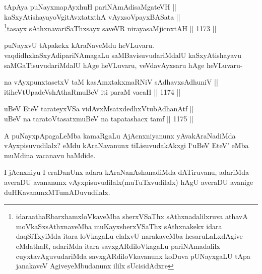 \begin{shl}
tApAya puNayxmapAyxhuH pariNAmAdisaMgateVH || \\
kaSxyAtishayayoVgitAvxtatxthA vAyxsoV\s payxBASata || \\
\footnote{idaraathaR\ndash  barxhamxloVkaveMba sherxVSaThx sAthxnadalilxruva athavA moVkaSxsAthxnaveMba muKayxsherxVSaThx sAthxnakekx idara daqSiTxyiMda itara loVkagaLu elalxvU narakaveMba hesaruLaLxdAgive eMdathaR, adariMda itara savxgARdiloVkagaLu pariNAmadalilx cuyxtavAguvudariMda savxgARdiloVkavanunx koDuva pUNayxgaLU tApa janakaveV AgiveyeMbudanunx ililx sUcisidAdxre}tasayx sAthxnavariSaThxsayx saveVR nirayasaMjicnxtAH \hfill || 1173 ||  
\end{shl}	

\begin{artha}
puNayxvU tApakekx kAraNaveMdu heVLuvaru. vaqdidhxkaSxyAdi\break pariNAmagaLu saMBavisuvudariMdalU kaSxyAtishayavu saMGaTisuvudariMdalU hAge heVLuvaru, veVdavAyxsaru hAge heVLuvaru-
\end{artha}




\begin{shl}
na vAyxpunxtasetxV taM kasAmxtakxmaRNiV sAdhavxsAdhuniV || \\
itiheVtUpadeVshAthaRmuBeV iti paraM vacaH \hfill || 1174 ||  
\end{shl}
				
\begin{shl}
uBeV EteV tarateyxVSa vidAvxMsatxdedhxVtubAdhanAtf || \\
uBeV na taratoV\s tasatxmuBeV na tapatashacx tamf \hfill || 1175 ||  
\end{shl}

\begin{artha}
A puNayxpApagaLeMba kamaRgaLu AjAcnxniyanunx yAvakAraNadiMda vAyxpisuvudilalx? eMdu 
kAraNavanunx tiLisuvudakAkxgi I\break `uBeV EteV' eMba muMdina vacanavu baMdide.
\end{artha}

\begin{artha}
I jAcnxniyu I eraDanUnx adara kAraNanAshanadiMda dATiruvanu, adariMda averaDU avananunx vAyxpisuvudilalx(muTuTxvudilalx) hAgU averaDU avanige duHKavanunxMTumADuvudilalx.
\end{artha}

